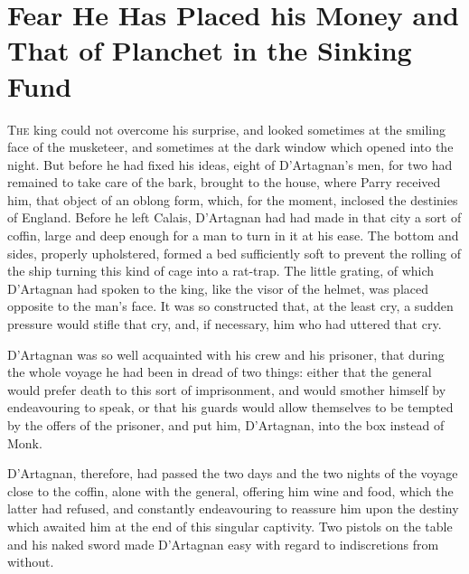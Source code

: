 \chapter{Fear He Has Placed his Money and That of Planchet in the Sinking Fund}

\lettrine{T}{he} king could not overcome his surprise, and looked sometimes at the smiling face of the musketeer, and sometimes at the dark window which opened into the night. But before he had fixed his ideas, eight of D'Artagnan's men, for two had remained to take care of the bark, brought to the house, where Parry received him, that object of an oblong form, which, for the moment, inclosed the destinies of England. Before he left Calais, D'Artagnan had had made in that city a sort of coffin, large and deep enough for a man to turn in it at his ease. The bottom and sides, properly upholstered, formed a bed sufficiently soft to prevent the rolling of the ship turning this kind of cage into a rat-trap. The little grating, of which D'Artagnan had spoken to the king, like the visor of the helmet, was placed opposite to the man's face. It was so constructed that, at the least cry, a sudden pressure would stifle that cry, and, if necessary, him who had uttered that cry.

D'Artagnan was so well acquainted with his crew and his prisoner, that during the whole voyage he had been in dread of two things: either that the general would prefer death to this sort of imprisonment, and would smother himself by endeavouring to speak, or that his guards would allow themselves to be tempted by the offers of the prisoner, and put him, D'Artagnan, into the box instead of Monk.

D'Artagnan, therefore, had passed the two days and the two nights of the voyage close to the coffin, alone with the general, offering him wine and food, which the latter had refused, and constantly endeavouring to reassure him upon the destiny which awaited him at the end of this singular captivity. Two pistols on the table and his naked sword made D'Artagnan easy with regard to indiscretions from without.

